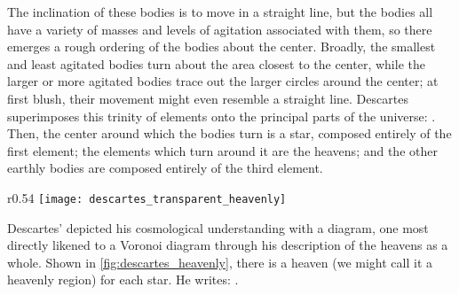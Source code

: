 \documentclass[12pt,twoside]{reedthesis}
\begin{document}
    The inclination of these  bodies is to move in a straight line, but the bodies all have a variety of masses and levels of agitation associated with them, so there emerges a rough ordering of the bodies about the center. Broadly, the smallest and least agitated bodies turn about the area closest to the center, while the larger or more agitated bodies trace out the larger circles around the center; at first blush, their movement might even resemble a straight line. Descartes superimposes this trinity of elements onto the principal parts of the universe: \citep[][p. 20]{descartes}. Then, the center around which the bodies turn is a star, composed entirely of the first element; the elements which turn around it are the heavens; and the other earthly bodies are composed entirely of the third element.\par


    \begin{wrapfigure}{r}{0.54\textwidth}
      \centering
      \texttt{[image: descartes\_transparent\_heavenly]}
      \caption{Descartes' Heavenly Regions}
      \label{fig:descartes_heavenly}
    \end{wrapfigure}


   Descartes' depicted his cosmological understanding with a diagram, one most directly likened to a Voronoi diagram through his description of the heavens as a whole. Shown in \cref{fig:descartes_heavenly}, there is a heaven (we might call it a heavenly region) for each star. He writes: \citep[p. 35]{descartes}.\par
\end{document}
